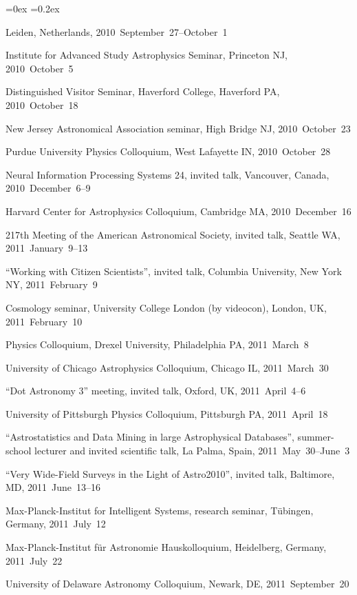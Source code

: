 \documentclass[12pt,letterpaper]{article}
\newcounter{refpubnum}
\newcommand{\hogglist}{%
    \rightmargin=0in
    \leftmargin=0.18in
    \topsep=0ex
    \partopsep=0pt
    \itemsep=0.2ex
    \parsep=0pt
    \itemindent=-1.0\leftmargin
    \listparindent=0.0\leftmargin
    \settowidth{\labelsep}{~}
    \usecounter{refpubnum}
  }
\begin{document}
\begin{list}{}{\hogglist}
{          Leiden, Netherlands, 2010~September~27--October~1
\item Institute for Advanced Study Astrophysics Seminar,
          Princeton NJ, 2010~October~5
\item Distinguished Visitor Seminar, Haverford College,
          Haverford PA, 2010~October~18
\item New Jersey Astronomical Association seminar,
          High Bridge NJ, 2010~October~23
\item Purdue University Physics Colloquium,
          West Lafayette IN, 2010~October~28
\item Neural Information Processing Systems 24, invited talk,
          Vancouver, Canada, 2010~December~6--9
\item Harvard Center for Astrophysics Colloquium,
          Cambridge MA, 2010~December~16
\item 217th Meeting of the American Astronomical Society, invited talk,
          Seattle WA, 2011~January~9--13
\item ``Working with Citizen Scientists'', invited talk,
          Columbia University, New York NY, 2011~February~9
\item Cosmology seminar, University College London (by videocon),
          London, UK, 2011~February~10
\item Physics Colloquium, Drexel University,
          Philadelphia PA, 2011~March~8
\item University of Chicago Astrophysics Colloquium, Chicago IL, 2011~March~30
\item ``Dot Astronomy 3'' meeting, invited talk, Oxford, UK, 2011~April~4--6
\item University of Pittsburgh Physics Colloquium, Pittsburgh PA, 2011~April~18
\item ``Astrostatistics and Data Mining in large Astrophysical Databases'', summer-school lecturer and invited scientific talk,
          La Palma, Spain, 2011~May~30--June~3
\item ``Very Wide-Field Surveys in the Light of Astro2010'', invited talk,
          Baltimore, MD, 2011~June~13--16
\item Max-Planck-Institut for Intelligent Systems, research seminar,
          T\"ubingen, Germany, 2011~July~12
\item Max-Planck-Institut f\"ur Astronomie Hauskolloquium,
          Heidelberg, Germany, 2011~July~22
\item University of Delaware Astronomy Colloquium,
          Newark, DE, 2011~September~20
}
\end{list}
\end{document}
